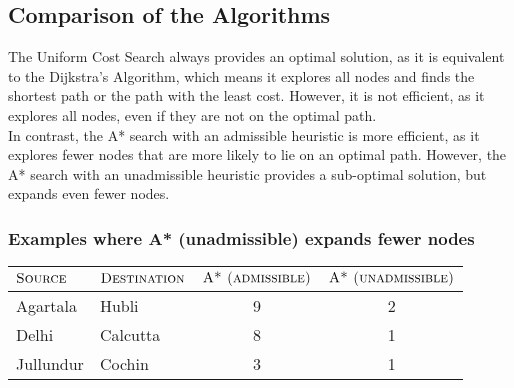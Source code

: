 \documentclass[12pt]{article}
\begin{document}
    \subsection*{Comparison of the Algorithms}
    The Uniform Cost Search always provides an optimal solution, as it is equivalent to the Dijkstra's
    Algorithm, which means it explores all nodes and finds the shortest path or the path with the least cost.
    However, it is not efficient, as it explores all nodes, even if they are not on the optimal path. \\
    In contrast, the A* search with an admissible heuristic is more efficient, as it explores fewer nodes
    that are more likely to lie on an optimal path. However, the A* search with an unadmissible heuristic
    provides a sub-optimal solution, but expands even fewer nodes.

    \subsubsection*{Examples where A* (unadmissible) expands fewer nodes}
    \begin{center}
        \begin{tabular}{ll|cc}
            $\textsc{Source}$ & $\textsc{Destination}$ & $\textsc{A* (admissible)}$ & $\textsc{A* (unadmissible)}$ \\
            \hline
            Agartala & Hubli & 9 & 2 \\
            Delhi & Calcutta & 8 & 1 \\
            Jullundur & Cochin & 3 & 1
        \end{tabular}
    \end{center}
\end{document}
